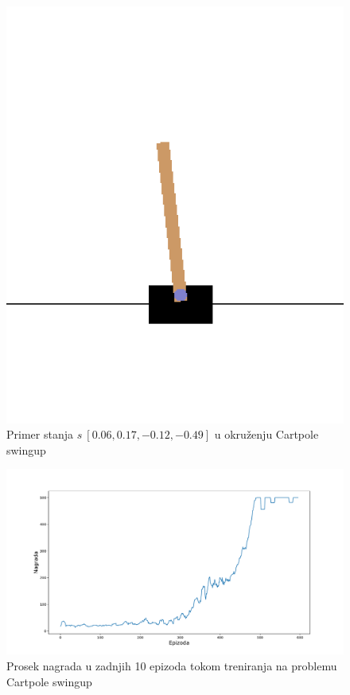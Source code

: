 \documentclass[a4paper,fleqn,12pt]{JMThesis}
\theoremstyle{plain}
\theoremstyle{definition}
\theoremstyle{definition}
\begin{document}
\begin{figure}[!ht]
	\centering
	\includegraphics[scale=0.4]{../graph-visuals/swingup/swingup-sample.png}
	\caption{Primer stanja $s ~ [0.06, 0.17, -0.12, -0.49]$ u okruženju Cartpole swingup}
\end{figure}
\begin{figure}[!ht]
	\centering
	\includegraphics[scale=0.4]{../graph-visuals/swingup/plot.pdf}
	\caption{Prosek nagrada u zadnjih 10 epizoda tokom treniranja na problemu Cartpole swingup}
\end{figure}
\clearpage
\end{document}
